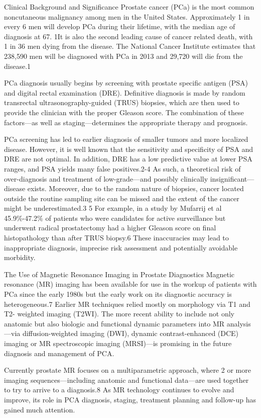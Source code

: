 Clinical Background and Significance 
Prostate cancer (PCa) is the most common noncutaneous malignancy among men in the United States. Approximately 1 in every 6 men will develop PCa during their lifetime, with the median age of diagnosis at 67. 1It is also the second leading cause of cancer related death, with 1 in 36 men dying from the disease. The National Cancer Institute estimates that 238,590 men will be diagnosed with PCa in 2013 and 29,720 will die from the disease.1

PCa diagnosis usually begins by screening with prostate specific antigen (PSA) and digital rectal examination (DRE).  Definitive diagnosis is made by random transrectal ultrasonography-guided (TRUS) biopsies, which are then used to provide the clinician with the proper Gleason score. The combination of these factors—as well as staging—determines the appropriate therapy and prognosis. 

PCa screening has led to earlier diagnosis of smaller tumors and more localized disease.  However, it is well known that the sensitivity and specificity of PSA and DRE are not optimal. In addition, DRE has a low predictive value at lower PSA ranges, and PSA yields many false positives.2-4 As such, a theoretical risk of over-diagnosis and treatment of low-grade—and possibly clinically insignificant—disease exists. Moreover, due to the random nature of biopsies, cancer located outside the routine sampling site can be missed and the extent of the cancer might be underestimated.3 5 For example, in a study by Mufarrij et al 45.9\%-47.2\% of patients who were candidates for active surveillance but underwent radical prostatectomy had a higher Gleason score on final histopathology than after TRUS biopsy.6 These inaccuracies may lead to inappropriate diagnosis, imprecise risk assessment and potentially avoidable morbidity.

The Use of Magnetic Resonance Imaging in Prostate Diagnostics
Magnetic resonance (MR) imaging has been available for use in the workup of patients with PCa since the early 1980s but the early work on its diagnostic accuracy is heterogeneous.7 Earlier MR techniques relied mostly on morphology via T1 and T2- weighted imaging (T2WI). The more recent ability to include not only anatomic but also biologic and functional dynamic parameters into MR analysis—via diffusion-weighted imaging (DWI), dynamic contrast-enhanced (DCE) imaging or MR spectroscopic imaging (MRSI)—is promising in the future diagnosis and management of PCA.

 Currently prostate MR focuses on a multiparametric approach, where 2 or more imaging sequences—including anatomic and functional data—are used together to try to arrive to a diagnosis.8 As MR technology continues to evolve and improve, its role in PCA diagnosis, staging, treatment planning and follow-up has gained much attention.

